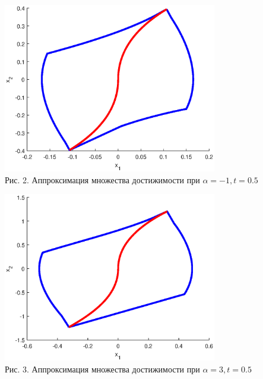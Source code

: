 \documentclass{article}
\theoremstyle{definition}
\begin{document}
	\begin{center}
		\includegraphics[width=0.7\textwidth]{example2.eps}\\
		{Рис. 2. Аппроксимация множества достижимости при $\alpha = -1, t = 0.5$ }
	\end{center}

	\begin{center}
		\includegraphics[width=0.7\textwidth]{example3.eps}\\
		{Рис. 3. Аппроксимация множества достижимости при $\alpha = 3, t = 0.5$ }
	\end{center}
\end{document}
